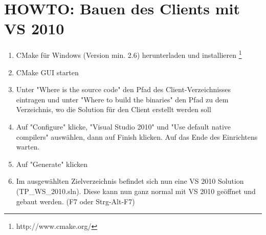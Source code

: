 \section{HOWTO: Bauen des Clients mit VS 2010}
\begin{enumerate}
	\item CMake für Windows (Version min. 2.6) herunterladen und installieren
 \footnote{http://www.cmake.org/}
	\item CMake GUI starten
	\item Unter "Where is the source code" den Pfad des Client-Verzeichnisses
 eintragen und unter "Where to build the binaries" den Pfad zu dem
Verzeichnis, wo die Solution für den Client erstellt werden soll
	\item Auf "Configure" klicke, "Visual Studio 2010" und "Use default
native compilers" auswählen, dann auf Finish klicken. Auf das Ende des
Einrichtens warten.
	\item Auf "Generate" klicken
	\item Im ausgewählten Zielverzeichnis befindet sich nun eine VS 2010
Solution (TP\_WS\_2010.sln). Diese kann nun ganz normal mit VS 2010
geöffnet und gebaut werden. (F7 oder Strg-Alt-F7)
\end{enumerate}